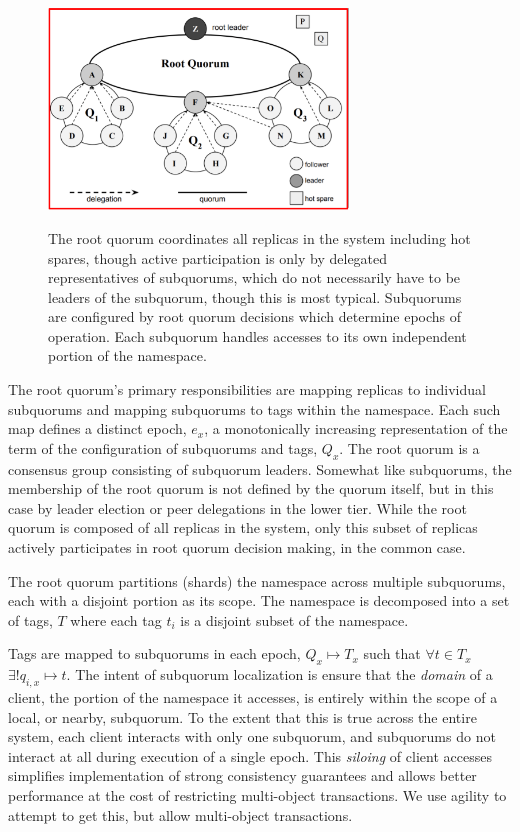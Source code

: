 \documentclass[sigplan,screen,review,anonymous,nonacm]{acmart}
\begin{document}
\begin{figure}
\caption{The root quorum coordinates all replicas in the system including hot 
spares, though active participation is only by delegated representatives of 
subquorums, which do not necessarily have to be leaders of the subquorum, 
though this is most typical. 
Subquorums are configured by root quorum decisions which determine epochs of 
operation.
Each subquorum handles accesses to its own independent portion of the
namespace.}
\centering
\includegraphics[width=8cm]{figure_3_root_quorum.png}
\label{fig:root_quorum}
\end{figure}

The root quorum's primary responsibilities are mapping replicas to individual 
subquorums and mapping subquorums to tags within the namespace.
Each such map defines a distinct epoch, $e_x$, a monotonically increasing 
representation of the term of the configuration of subquorums and tags, 
$Q_x$.
The root quorum is a consensus group consisting of subquorum leaders.
Somewhat like subquorums, the membership of the root quorum is not defined 
by the quorum itself, but in this case by leader election or peer delegations 
in the lower tier.
While the root quorum is composed of all replicas in the system, only this 
subset of replicas actively participates in root quorum decision making,
in the common case.

The root quorum partitions (shards) the namespace across multiple 
subquorums, each with a disjoint portion as its scope.
The namespace is decomposed into a set of tags, $T$ where each tag $t_i$ 
is a disjoint subset of the namespace.

Tags are mapped to subquorums in each epoch, $Q_x \mapsto T_x$ such that 
$\forall t \in T_x$ $\exists! q_{i,x} \mapsto t$.
The intent of subquorum localization is ensure that the \emph{domain} of 
a client, the portion of the namespace it accesses, is entirely within 
the scope of a local, or nearby, subquorum.
To the extent that this is true across the entire system, each client 
interacts with only one subquorum, and subquorums do not interact at all 
during execution of a single epoch.
This \emph{siloing} of client accesses simplifies implementation of 
strong consistency guarantees and allows better performance at the cost 
of restricting multi-object transactions.
We use agility to attempt to get this, but allow multi-object transactions.
\end{document}
